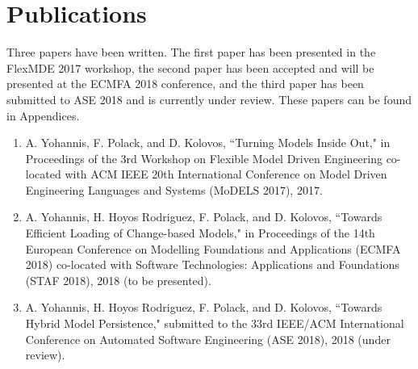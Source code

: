 \documentclass[12pt, a4paper]{report} \usepackage[titletoc]{appendix}
\begin{document}
\chapter{Publications}
\label{ch:publications}
Three papers have been written. The first paper \cite{DBLP:conf/models/YohannisKP17} has been presented in the FlexMDE 2017 workshop, the second paper \cite{yohannis2018towards} has been accepted and will be presented at the ECMFA 2018 conference, and the third paper \cite{yohannis2018hybrid} has been submitted to ASE 2018 and is currently under review. These papers can be found in Appendices.
\begin{enumerate}
\item A. Yohannis, F. Polack, and D. Kolovos, ``Turning Models Inside Out," in Proceedings of the 3rd Workshop on Flexible Model Driven Engineering co-located with ACM IEEE 20th International Conference on Model Driven Engineering Languages and Systems (MoDELS 2017), 2017.
\item  A. Yohannis, H. Hoyos Rodriguez, F. Polack, and D. Kolovos, ``Towards Efficient Loading of Change-based Models," in Proceedings of the 14th European Conference on Modelling Foundations and Applications (ECMFA 2018) co-located with Software Technologies: Applications and Foundations (STAF 2018), 2018 (to be presented).
\item  A. Yohannis, H. Hoyos Rodriguez, F. Polack, and D. Kolovos, ``Towards Hybrid Model Persistence," submitted to the 33rd IEEE/ACM International Conference on Automated Software Engineering (ASE 2018), 2018 (under review).
\end{enumerate}





\end{document}
